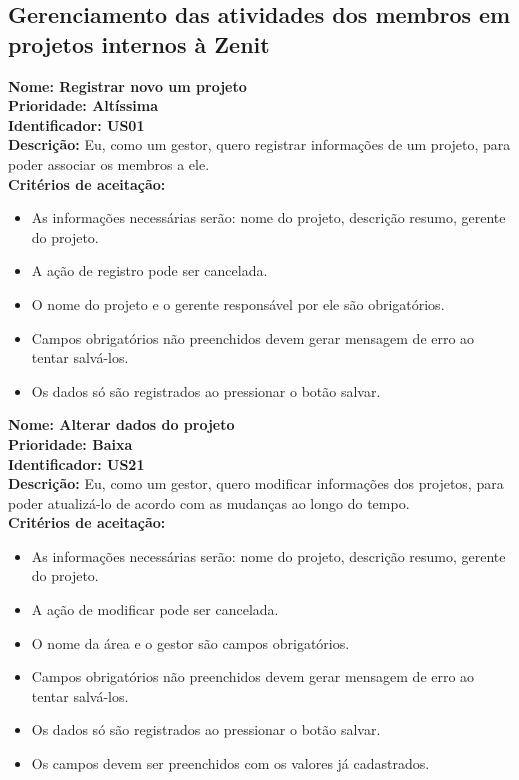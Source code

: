 \begin{anexosenv}
\subsection{Gerenciamento das atividades dos membros em projetos internos à Zenit}
\indent \textbf{Nome: Registrar novo um projeto\\
    \indent Prioridade:  Altíssima\\
    \indent Identificador: US01\\
    \indent Descrição:} Eu, como um gestor, quero registrar informações de um projeto, para poder associar os membros a ele.\\
\indent \textbf{Critérios de aceitação:}
\begin{itemize}
    \item As informações necessárias serão: nome do projeto, descrição resumo, gerente do projeto.
    \item A ação de registro pode ser cancelada.
    \item O nome do projeto e o gerente responsável por ele são obrigatórios.
    \item Campos obrigatórios não preenchidos devem gerar mensagem de erro ao tentar salvá-los.
    \item Os dados só são registrados ao pressionar o botão salvar.
\end{itemize}


\indent \textbf{Nome: Alterar dados do projeto\\
    \indent Prioridade: Baixa\\
    \indent Identificador: US21\\
    \indent Descrição:} Eu, como um gestor, quero modificar informações dos projetos, para poder atualizá-lo de acordo com as mudanças ao longo do tempo.\\
\indent \textbf{Critérios de aceitação:}
\begin{itemize}
    \item As informações necessárias serão: nome do projeto, descrição resumo, gerente do projeto.
    \item A ação de modificar pode ser cancelada.
    \item O nome da área e o gestor são campos obrigatórios.
    \item Campos obrigatórios não preenchidos devem gerar mensagem de erro ao tentar salvá-los.
    \item Os dados só são registrados ao pressionar o botão salvar.
    \item Os campos devem ser preenchidos com os valores já cadastrados.
\end{itemize}



\end{anexosenv}
